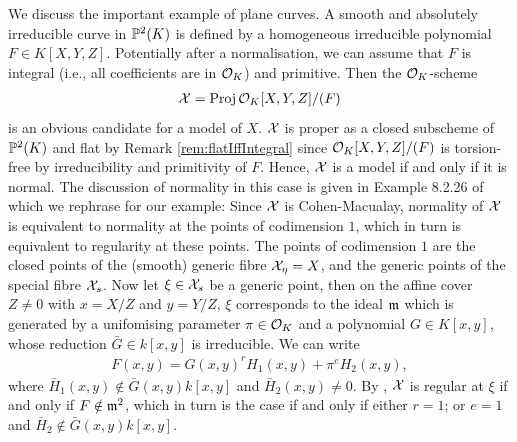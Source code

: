 \begin{example}\label{ex:model-of-plane-curve}
    We discuss the important example of plane curves. 
    A smooth and absolutely irreducible curve in $\mathbb P^2(K)$ is defined by a homogeneous irreducible polynomial $F \in K [X,Y,Z]$.
    Potentially after a normalisation, we can assume that $F$ is integral (i.e., all coefficients are in $\mathcal O_K$) and primitive.
    Then the $\mathcal O_K$-scheme 
    \begin{align}
        \mathcal X = \operatorname{Proj}{\mathcal O_K[X,Y,Z]/(F)}
    \end{align}
    is an obvious candidate for a model of $X$.
    $\mathcal X$ is proper as a closed subscheme of $\mathbb P^2(K)$ and flat by Remark \ref{rem:flatIffIntegral} since 
    $\mathcal O_K[X,Y,Z]/(F)$ is torsion-free by irreducibility and primitivity of $F$.
    Hence, $\mathcal X$ is a model if and only if it is normal.
    The discussion of normality in this case is given in Example 8.2.26 of \cite{Liu} which we rephrase for our example:
    Since $\mathcal X$ is Cohen-Macualay, normality of $\mathcal X$ is equivalent to normality at the points of codimension $1$,
    which in turn is equivalent to regularity at these points.
    The points of codimension $1$ are the closed points of the (smooth) generic fibre $\mathcal X_\eta = X$,
    and the generic points of the special fibre $\mathcal X_s$.
    Now let $\xi \in \mathcal X_s$ be a generic point, then on the affine cover $Z \neq 0$
    with $x = X/Z$ and $y = Y/Z$, $\xi$ corresponds to the ideal $\mathfrak m$ which is generated by a unifomising parameter $\pi \in \mathcal O_K$
    and a polynomial $G \in K[x,y]$, whose reduction $\bar{G} \in k[x,y]$ is irreducible.
    We can write 
    \begin{align}
        F(x,y) = G(x,y)^r H_1(x,y) + \pi^e H_2(x,y),
    \end{align}
    where $\bar{H}_1(x,y) \notin \bar{G}(x,y)k[x,y]$ and $\bar{H}_2(x,y)\neq 0$.
    By \cite[Corollary 4.2.12]{Liu}, $\mathcal X$ is regular at $\xi$ if and only if $F \notin \mathfrak m^2$,
    which in turn is the case if and only if either $r=1$; or $e=1$ and $\bar{H}_2 \notin \bar{G}(x,y)k[x,y]$.
    
\end{example}

